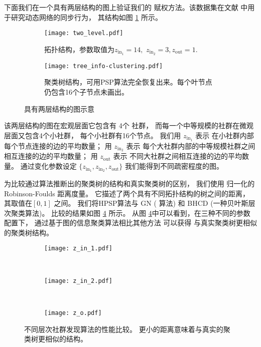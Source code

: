 下面我们在一个具有两层结构的图上验证我们的
赋权方法。该数据集在文献
\cite{RN22} 中用于研究动态网络的同步行为，
其结构如图 \ref{fig:c1} 所示。 

\begin{figure}
	\centering
	\begin{subfigure}{0.45\textwidth}
		\texttt{[image: two\_level.pdf]}
		\caption{拓扑结构，参数取值为$z_{\mathrm{in}_1} = 14,$ $z_{\mathrm{in}_2} = 3, z_{\mathrm{out}}=1$.}\label{fig:c1}
	\end{subfigure}
	\begin{subfigure}{0.45\textwidth}
		\texttt{[image: tree\_info-clustering.pdf]}
		\caption{聚类树结构，可用PSP算法完全恢复出来。每个叶节点仍包含16个子节点未画出。}
    \label{fig:c2}
	\end{subfigure}
	\caption{具有两层结构的图示意}
\end{figure}

该两层结构的图在宏观层面它包含有 4个 社群，
而每一个中等规模的社群在微观层面又包含4个小社群，
每个小社群有16个节点。
我们用 $z_{\mathrm{in}_1}$ 表示
在小社群内部每个节点连接的边的平均数量；
用 $z_{\mathrm{in}_2}$ 表示
每个大社群内部的中等规模社群之间相互连接的边的平均数量；
用 $z_{\mathrm{out}}$ 表示
不同大社群之间相互连接的边的平均数量。
通过变化参数设定 $\{z_{\mathrm{in}_1}, z_{\mathrm{in}_2}, z_{\mathrm{out}} \}$
我们能得到不同疏密程度的图。

为比较通过算法推断出的聚类树的结构和真实聚类树的区别，
我们使用 归一化的 Robinson-Foulds 距离度量。
它描述了两个具有不同拓扑结构的树之间的距离，
其取值在$[0,1]$ 之间。
我们将HPSP算法与
GN (   算法) 和 BHCD (一种贝叶斯层次聚类算法\cite{RN23})。
比较的结果如图 \ref{fig:cdr} 所示。
从图 \ref{fig:cdr}中可以看到，在三种不同的参数配置下，
通过基于图的信息聚类算法相比其他方法 可以获得
与真实聚类树更相似的聚类树结构。

\begin{figure}
	\centering
	\begin{subfigure}{0.33\textwidth}
		\texttt{[image: z\_in\_1.pdf]}
		\caption{}
	\end{subfigure}~
	\begin{subfigure}{0.33\textwidth}
		\texttt{[image: z\_in\_2.pdf]}
		\caption{}
	\end{subfigure}~
	\begin{subfigure}{0.33\textwidth}
		\texttt{[image: z\_o.pdf]}
		\caption{}
	\end{subfigure}
	\caption{不同层次社群发现算法的性能比较。
  更小的距离意味着与真实的聚类树更相似的结构。
  }\label{fig:cdr}	
\end{figure}

